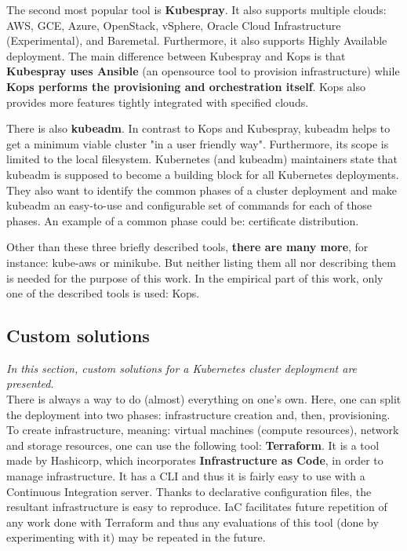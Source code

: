 The second most popular tool is \textbf{Kubespray}. It also supports multiple clouds: AWS, GCE, Azure, OpenStack, vSphere, Oracle Cloud Infrastructure (Experimental), and Baremetal\cite{online-ks}. Furthermore, it also supports Highly Available deployment. The main difference between Kubespray and Kops is that \textbf{Kubespray uses Ansible} (an opensource tool to provision infrastructure) while \textbf{Kops performs the provisioning and orchestration itself}. Kops also provides more features tightly integrated with specified clouds\cite{online-ks-comp}.

There is also \textbf{kubeadm}. In contrast to Kops and Kubespray, kubeadm helps to get a minimum viable cluster "in a user friendly way". Furthermore, its scope is limited to the local filesystem\cite{online-kubeadm}. Kubernetes (and kubeadm) maintainers state that kubeadm is supposed to become a building block for all Kubernetes deployments. They also want to identify the common phases of a cluster deployment and make kubeadm an easy-to-use and configurable set of commands for each of those phases. An example of a common phase could be: certificate distribution\cite{kubeadm-vision-2017}.

Other than these three briefly described tools, \textbf{there are many more}, for instance: kube-aws\cite{kube-aws} or minikube\cite{minikube}. But neither listing them all nor describing them is needed for the purpose of this work. In the empirical part of this work, only one of the described tools is used: Kops.

\subsection{Custom solutions}
\textit{In this section, custom solutions for a Kubernetes cluster deployment are presented.}
\\

There is always a way to do (almost) everything on one's own. Here, one can split the deployment into two phases: infrastructure creation and, then, provisioning. To create infrastructure, meaning: virtual machines (compute resources), network and storage resources, one can use the following tool: \textbf{Terraform}. It is a tool made by Hashicorp, which incorporates \textbf{Infrastructure as Code}, in order to manage infrastructure. It has a CLI and thus it is fairly easy to use with a Continuous Integration server. Thanks to declarative configuration files, the resultant infrastructure is easy to reproduce\cite{terraform}. IaC facilitates future repetition of any work done with Terraform and thus any evaluations of this tool (done by experimenting with it) may be repeated in the future.

